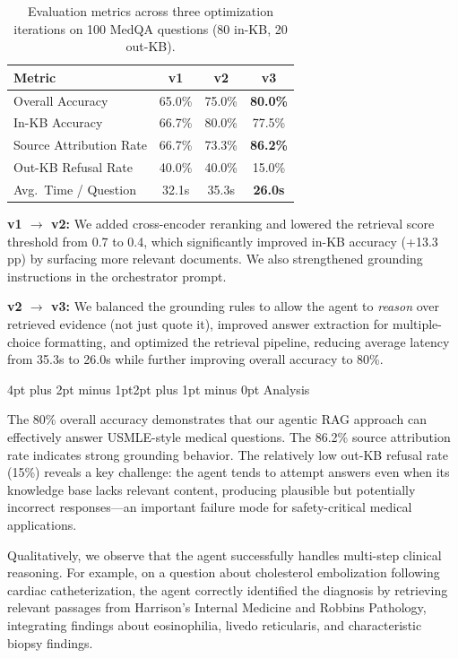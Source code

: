 \documentclass[10pt,twocolumn,letterpaper]{article}
\makeatletter
\renewcommand\subsection{\@startsection{subsection}{2}{\z@}%
  {4pt plus 2pt minus 1pt}{2pt plus 1pt minus 0pt}%
  {\normalsize\bfseries}}
\makeatother
\begin{document}
\begin{table}[h]
\centering
\small
\begin{tabular}{lccc}
\toprule
\textbf{Metric} & \textbf{v1} & \textbf{v2} & \textbf{v3} \\
\midrule
Overall Accuracy & 65.0\% & 75.0\% & \textbf{80.0\%} \\
In-KB Accuracy & 66.7\% & 80.0\% & 77.5\% \\
Source Attribution Rate & 66.7\% & 73.3\% & \textbf{86.2\%} \\
Out-KB Refusal Rate & 40.0\% & 40.0\% & 15.0\% \\
Avg.\ Time / Question & 32.1s & 35.3s & \textbf{26.0s} \\
\bottomrule
\end{tabular}
\vspace{2pt}
\caption{Evaluation metrics across three optimization iterations on 100 MedQA questions (80 in-KB, 20 out-KB).}
\label{tab:results}
\end{table}

\textbf{v1 $\to$ v2:} We added cross-encoder reranking and lowered the retrieval score threshold from 0.7 to 0.4, which significantly improved in-KB accuracy (+13.3 pp) by surfacing more relevant documents. We also strengthened grounding instructions in the orchestrator prompt.

\textbf{v2 $\to$ v3:} We balanced the grounding rules to allow the agent to \textit{reason} over retrieved evidence (not just quote it), improved answer extraction for multiple-choice formatting, and optimized the retrieval pipeline, reducing average latency from 35.3s to 26.0s while further improving overall accuracy to 80\%.

\subsection{Analysis}

The 80\% overall accuracy demonstrates that our agentic RAG approach can effectively answer USMLE-style medical questions. The 86.2\% source attribution rate indicates strong grounding behavior. The relatively low out-KB refusal rate (15\%) reveals a key challenge: the agent tends to attempt answers even when its knowledge base lacks relevant content, producing plausible but potentially incorrect responses---an important failure mode for safety-critical medical applications.

Qualitatively, we observe that the agent successfully handles multi-step clinical reasoning. For example, on a question about cholesterol embolization following cardiac catheterization, the agent correctly identified the diagnosis by retrieving relevant passages from Harrison's Internal Medicine and Robbins Pathology, integrating findings about eosinophilia, livedo reticularis, and characteristic biopsy findings.
\end{document}
